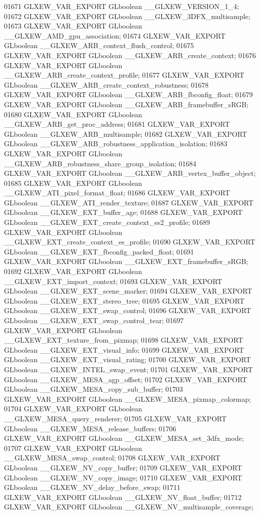 \begin{DoxyCode}
01671 GLXEW_VAR_EXPORT GLboolean __GLXEW_VERSION_1_4;
01672 GLXEW_VAR_EXPORT GLboolean __GLXEW_3DFX_multisample;
01673 GLXEW_VAR_EXPORT GLboolean __GLXEW_AMD_gpu_association;
01674 GLXEW_VAR_EXPORT GLboolean __GLXEW_ARB_context_flush_control;
01675 GLXEW_VAR_EXPORT GLboolean __GLXEW_ARB_create_context;
01676 GLXEW_VAR_EXPORT GLboolean __GLXEW_ARB_create_context_profile;
01677 GLXEW_VAR_EXPORT GLboolean __GLXEW_ARB_create_context_robustness;
01678 GLXEW_VAR_EXPORT GLboolean __GLXEW_ARB_fbconfig_float;
01679 GLXEW_VAR_EXPORT GLboolean __GLXEW_ARB_framebuffer_sRGB;
01680 GLXEW_VAR_EXPORT GLboolean __GLXEW_ARB_get_proc_address;
01681 GLXEW_VAR_EXPORT GLboolean __GLXEW_ARB_multisample;
01682 GLXEW_VAR_EXPORT GLboolean __GLXEW_ARB_robustness_application_isolation;
01683 GLXEW_VAR_EXPORT GLboolean __GLXEW_ARB_robustness_share_group_isolation;
01684 GLXEW_VAR_EXPORT GLboolean __GLXEW_ARB_vertex_buffer_object;
01685 GLXEW_VAR_EXPORT GLboolean __GLXEW_ATI_pixel_format_float;
01686 GLXEW_VAR_EXPORT GLboolean __GLXEW_ATI_render_texture;
01687 GLXEW_VAR_EXPORT GLboolean __GLXEW_EXT_buffer_age;
01688 GLXEW_VAR_EXPORT GLboolean __GLXEW_EXT_create_context_es2_profile;
01689 GLXEW_VAR_EXPORT GLboolean __GLXEW_EXT_create_context_es_profile;
01690 GLXEW_VAR_EXPORT GLboolean __GLXEW_EXT_fbconfig_packed_float;
01691 GLXEW_VAR_EXPORT GLboolean __GLXEW_EXT_framebuffer_sRGB;
01692 GLXEW_VAR_EXPORT GLboolean __GLXEW_EXT_import_context;
01693 GLXEW_VAR_EXPORT GLboolean __GLXEW_EXT_scene_marker;
01694 GLXEW_VAR_EXPORT GLboolean __GLXEW_EXT_stereo_tree;
01695 GLXEW_VAR_EXPORT GLboolean __GLXEW_EXT_swap_control;
01696 GLXEW_VAR_EXPORT GLboolean __GLXEW_EXT_swap_control_tear;
01697 GLXEW_VAR_EXPORT GLboolean __GLXEW_EXT_texture_from_pixmap;
01698 GLXEW_VAR_EXPORT GLboolean __GLXEW_EXT_visual_info;
01699 GLXEW_VAR_EXPORT GLboolean __GLXEW_EXT_visual_rating;
01700 GLXEW_VAR_EXPORT GLboolean __GLXEW_INTEL_swap_event;
01701 GLXEW_VAR_EXPORT GLboolean __GLXEW_MESA_agp_offset;
01702 GLXEW_VAR_EXPORT GLboolean __GLXEW_MESA_copy_sub_buffer;
01703 GLXEW_VAR_EXPORT GLboolean __GLXEW_MESA_pixmap_colormap;
01704 GLXEW_VAR_EXPORT GLboolean __GLXEW_MESA_query_renderer;
01705 GLXEW_VAR_EXPORT GLboolean __GLXEW_MESA_release_buffers;
01706 GLXEW_VAR_EXPORT GLboolean __GLXEW_MESA_set_3dfx_mode;
01707 GLXEW_VAR_EXPORT GLboolean __GLXEW_MESA_swap_control;
01708 GLXEW_VAR_EXPORT GLboolean __GLXEW_NV_copy_buffer;
01709 GLXEW_VAR_EXPORT GLboolean __GLXEW_NV_copy_image;
01710 GLXEW_VAR_EXPORT GLboolean __GLXEW_NV_delay_before_swap;
01711 GLXEW_VAR_EXPORT GLboolean __GLXEW_NV_float_buffer;
01712 GLXEW_VAR_EXPORT GLboolean __GLXEW_NV_multisample_coverage;

\end{DoxyCode}
